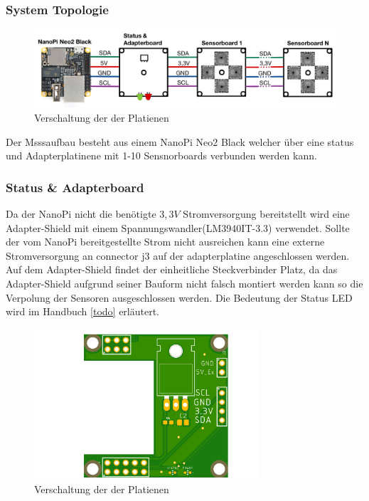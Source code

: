 \subsubsection{System Topologie}
\begin{figure}[H]
\centering
\includegraphics[width=1\textwidth]{img/System-Topologie.png}
\caption{Verschaltung der der Platienen}
\label{fig:Seitenasicht-AS726X}
\end{figure}

Der Msssaufbau besteht aus einem NanoPi Neo2 Black welcher über eine status und Adapterplatinene mit 1-10 Sensnorboards verbunden werden kann.


\subsubsection{Status \& Adapterboard}
Da der NanoPi nicht die benötigte $3,3V$ Stromversorgung bereitstellt wird eine Adapter-Shield mit einem Spannungswandler(LM3940IT-3.3) verwendet.
Sollte der vom NanoPi bereitgestellte Strom nicht ausreichen kann eine externe Stromversorgung an connector j3 auf der adapterplatine angeschlossen werden.
Auf dem Adapter-Shield findet der einheitliche Steckverbinder Platz, da das Adapter-Shield aufgrund seiner Bauform nicht falsch montiert werden kann so die Verpolung der Sensoren ausgeschlossen werden.
Die Bedeutung der Status LED wird im Handbuch \ref{todo} erläutert.\\

\begin{figure}[H]
\centering
\includegraphics[width=0.75\textwidth]{img/nanopi-black2-shield}
\caption{Verschaltung der der Platienen}
\label{fig:Seitenasicht-AS726X}
\end{figure}
